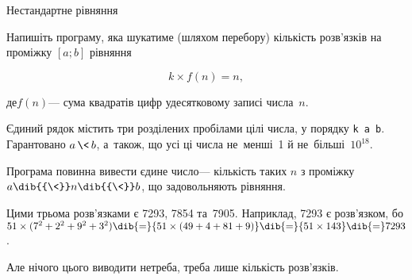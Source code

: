 \begin{problemAllDefault}{Нестандартне рівняння}

Напишіть програму, яка шукатиме (шляхом перебору) кількість розв'язків на проміжку $[a; b]$ рівняння

\vspace{-1.5\baselineskip}

$$
k\times{}f(n)=n,
$$

\vspace{-0.25\baselineskip}

\noindent
де\nolinebreak[3] $f(n)$\nolinebreak[3] --- сума квадратів цифр у\nolinebreak[3] десятковому записі числа~$n$.

\InputFile 
Єдиний рядок містить три розділених пробілами цілі числа, у порядку \verb"k a b". Гарантовано ${a\,{\<}\,b}$, а~також, що усі ці числа не~менші~1 й не~більші~$10^{18}$.

\OutputFile	
Програма повинна вивести єдине число\nolinebreak[3] --- кількість таких $n$ з проміжку $a\dib{{\<}}n\dib{{\<}}b$, що задовольняють рівняння.

\Example
\begin{exampleSimple}{7em}{3em}%
%
\end{exampleSimple}

\Notes
Цими трьома розв'язками є 7293, 7854 та~7905.
Наприклад, 7293 є розв'язком, бо ${51\times{(7^2+2^2+9^2+3^2)}} \dib{{=}} {51\times{(49+4+81+9)}} \dib{{=}} {51\times143} \dib{{=}} 7293$.

Але нічого цього виводити не\nolinebreak[3] треба, треба лише кількість розв'язків.

\end{problemAllDefault}